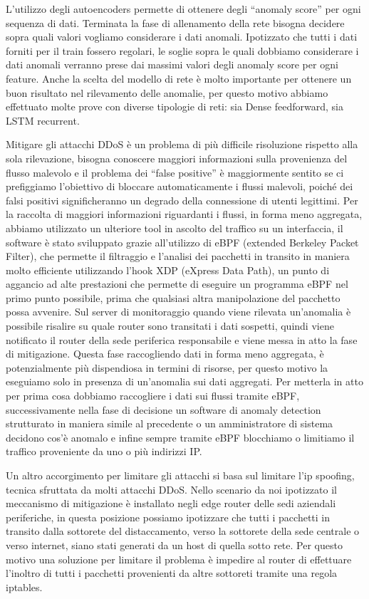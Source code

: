 L'utilizzo degli autoencoders permette di ottenere degli “anomaly score” per ogni sequenza di dati. Terminata la fase di allenamento della rete bisogna decidere sopra quali valori vogliamo considerare i dati anomali. Ipotizzato che tutti i dati forniti per il train fossero regolari, le soglie sopra le quali dobbiamo considerare i dati anomali verranno prese dai massimi valori degli anomaly score per ogni feature. Anche la scelta del modello di rete è molto importante per ottenere un buon risultato nel rilevamento delle anomalie, per questo motivo abbiamo effettuato molte prove con diverse tipologie di reti: sia Dense feedforward, sia LSTM recurrent.

Mitigare gli attacchi DDoS è un problema di più difficile risoluzione rispetto alla sola rilevazione, bisogna conoscere maggiori informazioni sulla provenienza del flusso malevolo e il problema dei ``false positive'' è maggiormente sentito se ci prefiggiamo l'obiettivo di bloccare automaticamente i flussi malevoli, poiché dei falsi positivi significheranno un degrado della connessione di utenti legittimi.
Per la raccolta di maggiori informazioni riguardanti i flussi, in forma meno aggregata, abbiamo utilizzato un ulteriore tool in ascolto del traffico su un interfaccia, il software è stato sviluppato grazie all’utilizzo di eBPF (extended Berkeley Packet Filter), che permette il filtraggio e l'analisi dei pacchetti in transito in maniera molto efficiente utilizzando l’hook XDP (eXpress Data Path), un punto di aggancio ad alte prestazioni che permette di eseguire un programma eBPF nel primo punto possibile,  prima che qualsiasi altra manipolazione del pacchetto  possa avvenire.
Sul server di monitoraggio quando viene rilevata un'anomalia è possibile risalire su quale router sono transitati i dati sospetti, quindi viene notificato il router della sede periferica responsabile e viene messa in atto la fase di mitigazione. Questa fase raccogliendo dati in forma meno aggregata, è potenzialmente più dispendiosa in termini di risorse, per questo motivo la eseguiamo solo in presenza di un'anomalia sui dati aggregati.
Per metterla in atto per prima cosa dobbiamo raccogliere i dati sui flussi tramite eBPF, successivamente nella fase di decisione un software di anomaly detection strutturato in maniera simile al precedente o un amministratore di sistema decidono cos'è anomalo e infine sempre tramite eBPF blocchiamo o limitiamo il traffico proveniente da uno o più indirizzi IP.

Un altro accorgimento per limitare gli attacchi si basa sul limitare l’ip spoofing, tecnica sfruttata da molti attacchi DDoS. Nello scenario da noi ipotizzato il meccanismo di mitigazione è installato negli edge router delle sedi aziendali periferiche, in questa posizione possiamo ipotizzare che tutti i pacchetti in transito dalla sottorete del distaccamento, verso la sottorete della sede centrale o verso internet, siano stati generati da un host di quella sotto rete. Per questo motivo una soluzione per limitare il problema è impedire al router di effettuare l'inoltro di tutti i pacchetti provenienti da altre sottoreti tramite una regola iptables.


